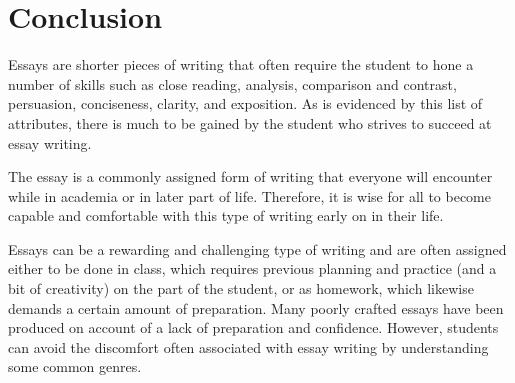 \chapter*{Conclusion}
Essays are shorter pieces of writing that often require the student to hone a number of skills such as close reading, analysis, comparison and contrast, persuasion, conciseness, clarity, and exposition. As is evidenced by this list of attributes, there is much to be gained by the student who strives to succeed at essay writing.


The essay is a commonly assigned form of writing that everyone will encounter while in academia or in later part of life. Therefore, it is wise for all to become capable and comfortable with this type of writing early on in their life.


Essays can be a rewarding and challenging type of writing and are often assigned either to be done in class, which requires previous planning and practice (and a bit of creativity) on the part of the student, or as homework, which likewise demands a certain amount of preparation. Many poorly crafted essays have been produced on account of a lack of preparation and confidence. However, students can avoid the discomfort often associated with essay writing by understanding some common genres.